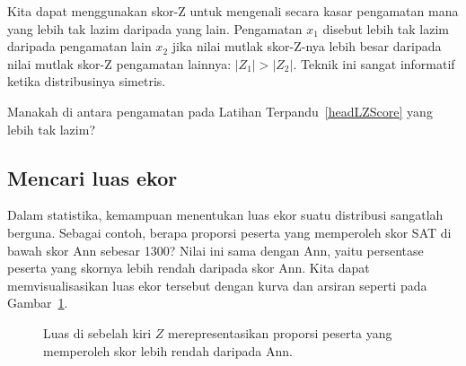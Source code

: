 Kita dapat menggunakan skor-Z untuk mengenali secara kasar
pengamatan mana yang lebih tak lazim daripada yang lain.
Pengamatan $x_1$ disebut lebih tak lazim daripada pengamatan lain $x_2$
jika nilai mutlak skor-Z-nya lebih besar daripada nilai mutlak
skor-Z pengamatan lainnya: $|Z_1| > |Z_2|$.
Teknik ini sangat informatif ketika distribusinya simetris.


\begin{exercisewrap}
\begin{nexercise}
Manakah di antara pengamatan pada Latihan Terpandu~\ref{headLZScore}
yang lebih tak lazim?\footnotemark{}
\end{nexercise}
\end{exercisewrap}

\subsection{Mencari luas ekor}

Dalam statistika, kemampuan menentukan luas ekor suatu distribusi
sangatlah berguna.
Sebagai contoh, berapa proporsi peserta yang memperoleh skor SAT
di bawah skor Ann sebesar 1300?
Nilai ini sama dengan  Ann, yaitu
persentase peserta yang skornya lebih rendah daripada skor Ann.
Kita dapat memvisualisasikan luas ekor tersebut dengan kurva dan
arsiran seperti pada Gambar~\ref{satBelow1300}.

\begin{figure}[h]
  \centering
  \caption{Luas di sebelah kiri $Z$ merepresentasikan proporsi peserta
      yang memperoleh skor lebih rendah daripada Ann.}
  \label{satBelow1300}
\end{figure}

